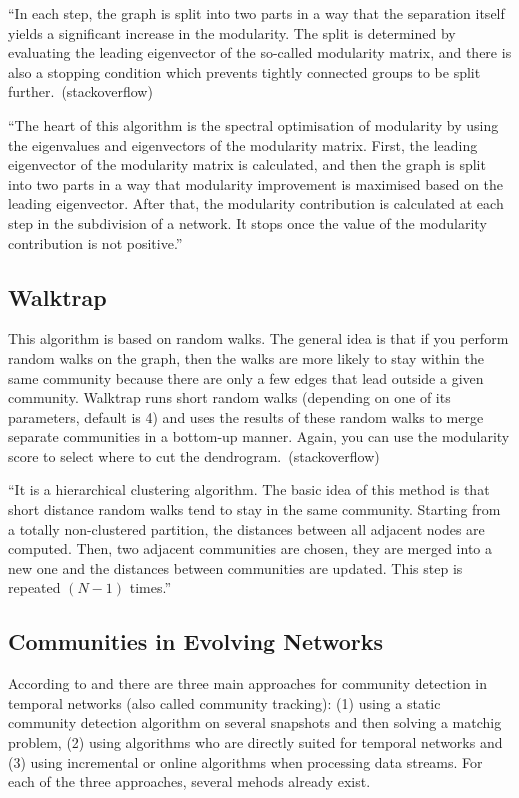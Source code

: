 ``In each step, the graph is split into two parts in a way that the separation itself yields a significant increase in the modularity. The split is determined by evaluating the leading eigenvector of the so-called modularity matrix, and there is also a stopping condition which prevents tightly connected groups to be split further.~(stackoverflow)

``The heart of this algorithm is the spectral optimisation of modularity by using the eigenvalues and eigenvectors of the modularity matrix. First, the leading eigenvector of the modularity matrix is calculated, and then the graph is split into two parts in a way that modularity improvement is maximised based on the leading eigenvector. After that, the modularity contribution is calculated at each step in the subdivision of a network. It stops once the value of the modularity contribution is not positive.''~\cite{yang2016comparative}

\subsection{Walktrap}
This algorithm is based on random walks. The general idea is that if you perform random walks on the graph, then the walks are more likely to stay within the same community because there are only a few edges that lead outside a given community. Walktrap runs short random walks (depending on one of its parameters, default is 4) and uses the results of these random walks to merge separate communities in a bottom-up manner. Again, you can use the modularity score to select where to cut the dendrogram.~(stackoverflow)

``It is a hierarchical clustering algorithm. The basic idea of this method is that short distance random walks tend to stay in the same community. Starting from a totally non-clustered partition, the distances between all adjacent nodes are computed. Then, two adjacent communities are chosen, they are merged into a new one and the distances between communities are updated. This step is repeated $(N − 1)$ times.''~\cite{yang2016comparative}

\subsection{Communities in Evolving Networks}
\label{sec:bg:tracking}
According to \textcite{aynaud2013communities} and \textcite{brodka2014community} there are three main approaches for community detection in temporal networks (also called community tracking): (1) using a static community detection algorithm on several snapshots and then solving a matchig problem, (2) using algorithms who are directly suited for temporal networks and (3) using incremental or online algorithms when processing data streams. For each of the three approaches, several mehods already exist.


